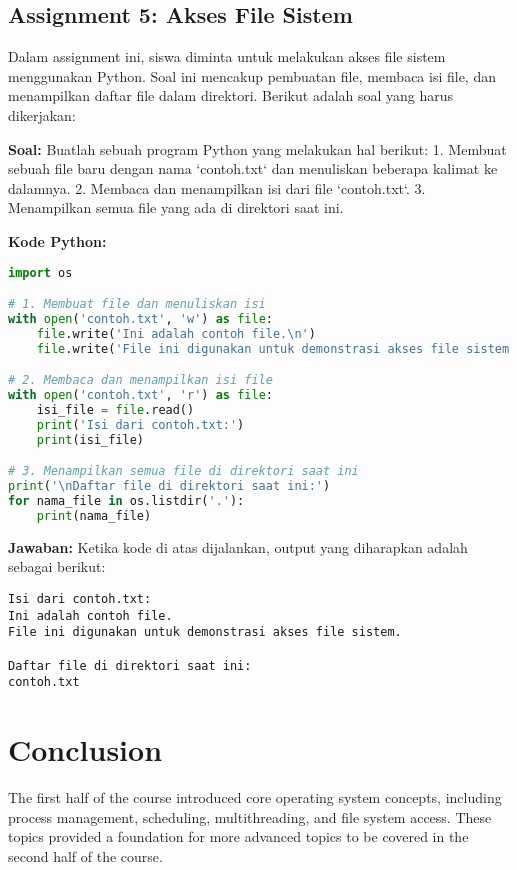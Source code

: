 \documentclass{article}
\begin{document}
\subsection{Assignment 5: Akses File Sistem}
Dalam assignment ini, siswa diminta untuk melakukan akses file sistem menggunakan Python. Soal ini mencakup pembuatan file, membaca isi file, dan menampilkan daftar file dalam direktori. Berikut adalah soal yang harus dikerjakan:

\textbf{Soal:} Buatlah sebuah program Python yang melakukan hal berikut:
1. Membuat sebuah file baru dengan nama `contoh.txt` dan menuliskan beberapa kalimat ke dalamnya.
2. Membaca dan menampilkan isi dari file `contoh.txt`.
3. Menampilkan semua file yang ada di direktori saat ini.

\textbf{Kode Python:}
\begin{lstlisting}[language=Python]
import os

# 1. Membuat file dan menuliskan isi
with open('contoh.txt', 'w') as file:
    file.write('Ini adalah contoh file.\n')
    file.write('File ini digunakan untuk demonstrasi akses file sistem.\n')

# 2. Membaca dan menampilkan isi file
with open('contoh.txt', 'r') as file:
    isi_file = file.read()
    print('Isi dari contoh.txt:')
    print(isi_file)

# 3. Menampilkan semua file di direktori saat ini
print('\nDaftar file di direktori saat ini:')
for nama_file in os.listdir('.'):
    print(nama_file)
\end{lstlisting}

\textbf{Jawaban:} Ketika kode di atas dijalankan, output yang diharapkan adalah sebagai berikut:
\begin{verbatim}
Isi dari contoh.txt:
Ini adalah contoh file.
File ini digunakan untuk demonstrasi akses file sistem.

Daftar file di direktori saat ini:
contoh.txt
\end{verbatim}


\section{Conclusion}
The first half of the course introduced core operating system concepts, including process management, scheduling, multithreading, and file system access. These topics provided a foundation for more advanced topics to be covered in the second half of the course.
\end{document}

